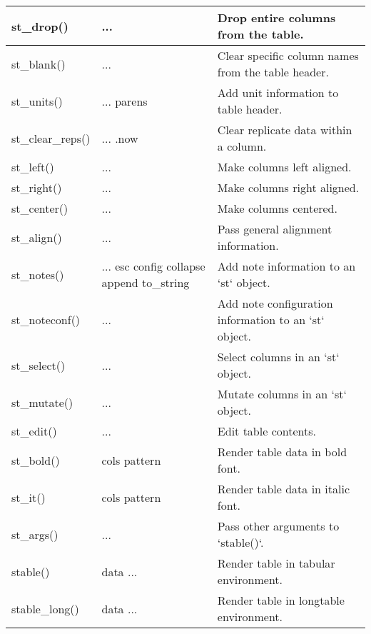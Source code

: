 \begin{threeparttable}
\begin{tabular}[h]{>{\raggedright\arraybackslash}p{3cm}>{\raggedright\arraybackslash}p{2.5cm}>{\raggedright\arraybackslash}p{7cm}}
st\_drop() & ... & Drop entire columns from the table. \\ \hline
st\_blank() & ... & Clear specific column names from the table header. \\ \hline
st\_units() & ...  \newline parens & Add unit information to table header. \\ \hline
st\_clear\_reps() & ...  \newline .now & Clear replicate data within a column. \\ \hline
st\_left() & ... & Make columns left aligned. \\ \hline
st\_right() & ... & Make columns right aligned. \\ \hline
st\_center() & ... & Make columns centered. \\ \hline
st\_align() & ... & Pass general alignment information. \\ \hline
st\_notes() & ...  \newline esc  \newline config  \newline collapse  \newline append  \newline to\_string & Add note information to an `st` object. \\ \hline
st\_noteconf() & ... & Add note configuration information to an `st` object. \\ \hline
st\_select() & ... & Select columns in an `st` object. \\ \hline
st\_mutate() & ... & Mutate columns in an `st` object. \\ \hline
st\_edit() & ... & Edit table contents. \\ \hline
st\_bold() & cols  \newline pattern & Render table data in bold font. \\ \hline
st\_it() & cols  \newline pattern & Render table data in italic font. \\ \hline
st\_args() & ... & Pass other arguments to `stable()`. \\ \hline
stable() & data  \newline ... & Render table in tabular environment. \\ \hline
stable\_long() & data  \newline ... & Render table in longtable environment. \\
\hline
\end{tabular}
\end{threeparttable}
